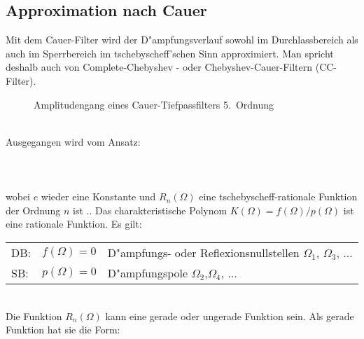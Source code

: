 \subsection{Approximation nach Cauer} 
Mit dem Cauer-Filter wird der D"ampfungsverlauf sowohl im Durchlassbereich als
auch im Sperrbereich im tschebyscheff'schen Sinn approximiert. Man spricht
deshalb auch von Complete-Chebyshev - oder Chebyshev-Cauer-Filtern (CC-Filter).
\begin{figure}[!htb]
\vspace*{-3mm}
\begin{center}
  \caption{Amplitudengang eines Cauer-Tiefpassfilters 5.~Ordnung}
\end{center}
\vspace*{-6mm} 
\end{figure}\\
\nit Ausgegangen wird vom Ansatz:\\~~\\
\\~\\
\nit wobei $e$ wieder eine Konstante und $R_{n} (\Omega)$ eine
tschebyscheff-rationale Funktion der Ordnung $n$ ist \cite{VAL:82}..
Das
charakteristische Polynom $K(\Omega)=f(\Omega)/p(\Omega)$ ist eine rationale Funktion. Es gilt:\\
\begin{tabular}{lll}
\hspace*{0.5cm} DB:& $f(\Omega)=0$ \hspace {1cm} & D"ampfungs- oder 
Reflexionsnullstellen $\Omega_{1}$, $\Omega_{3}$, $\ldots$\\
\hspace*{0.5cm} SB:& $p(\Omega)=0$ & D"ampfungspole $\Omega_{2}$,$\Omega_{4}$, $\ldots$
\end{tabular}\\
Die Funktion $R_{n}(\Omega)$ kann eine gerade oder ungerade Funktion sein.
Als gerade Funktion hat sie die Form:\\~\\
\\~~\\
